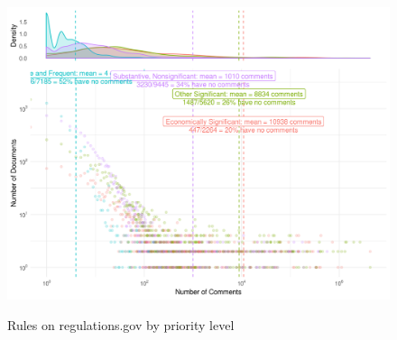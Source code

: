 \documentclass{article}
\begin{document}
\begin{figure}[p!]
    \centering
        \caption{Rules on regulations.gov by priority level}
    \includegraphics[width = 7in]{Figs/priority-comment-density-1.png}
    \label{fig:rules-priority}
\end{figure}
\clearpage 



\singlespace
\small
 

\end{document}

